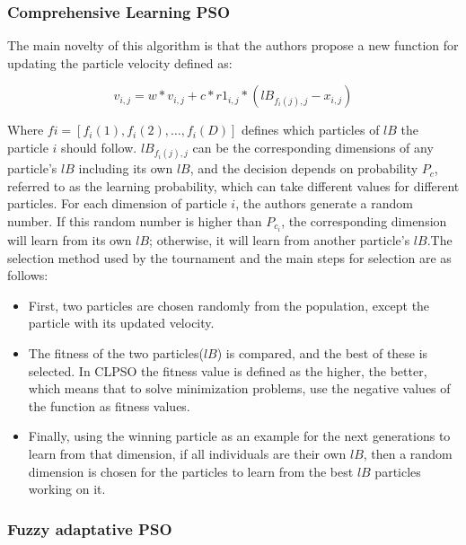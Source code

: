 \subsubsection{Comprehensive Learning PSO}


The main novelty of this algorithm is that the authors propose a new function for updating the particle velocity defined as:

\begin{equation}
     v_{i,j}=w\ast v_{i,j} + c \ast {r1_{i,j}} \ast \left ( lB_{f_i(j),j} - x_{i,j} \right ) 
\end{equation}


Where $fi=[f_i(1),f_i(2),…,f_i(D)]$ defines which particles of $lB$ the particle $i$ should follow. $lB_{f_i(j),j}$ can be the corresponding dimensions of any particle’s $lB$ including its own $lB$, and the decision depends on probability $P_c$, referred to as the learning probability, which can take different values for different particles.
For each dimension of particle $i$, the authors generate a random number. If this random number is higher than $P_{c_i}$, the corresponding dimension will learn from its own $lB$; otherwise, it will learn from another particle’s $lB$.The selection method used by the tournament and the main steps for selection are as follows:

\begin{itemize}
    \item First, two particles are chosen randomly from the population, except the particle with its updated velocity.
     \item The fitness of the two particles($lB$) is compared, and the best of these is selected. In CLPSO the fitness value is defined as the higher, the better, which means that to solve minimization problems, use the negative values of the function as fitness values.
      \item Finally, using the winning particle as an example for the next generations to learn from that dimension, if all individuals are their own $lB$, then a random dimension is chosen for the particles to learn from the best $lB$ particles working on it.
\end{itemize}

\subsubsection{Fuzzy adaptative PSO} 

